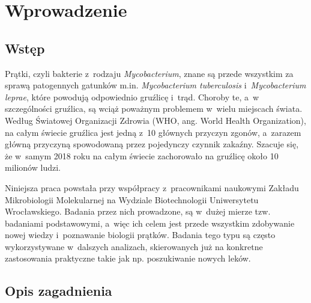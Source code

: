 \documentclass[declaration,shortabstract,mgr]{iithesis}
\author         {Artur Rosa}
\begin{document}



\chapter{Wprowadzenie}



\section{Wstęp}

Prątki, czyli bakterie z~rodzaju \emph{Mycobacterium}, znane są przede wszystkim za sprawą patogennych gatunków m.in. \emph{Mycobacterium tuberculosis} i~\emph{Mycobacterium leprae}, które powodują odpowiednio gruźlicę i~trąd. Choroby te, a~w szczególności gruźlica, są wciąż poważnym problemem w~wielu miejscach świata. Według Światowej Organizacji Zdrowia (WHO, ang. World Health Organization), na całym świecie gruźlica jest jedną z~10 głównych przyczyn zgonów, a~zarazem główną przyczyną spowodowaną przez pojedynczy czynnik zakaźny\cite{who-stats}. Szacuje się, że w~samym 2018 roku na całym świecie zachorowało na gruźlicę około 10 milionów ludzi.

Niniejsza praca powstała przy współpracy z~pracownikami naukowymi Zakładu Mikrobiologii Molekularnej na Wydziale Biotechnologii Uniwersytetu Wrocławskiego. Badania przez nich prowadzone, są w~dużej mierze tzw. badaniami podstawowymi, a~więc ich celem jest przede wszystkim zdobywanie nowej wiedzy i~poznawanie biologii prątków. Badania tego typu są często wykorzystywane w~dalszych analizach, skierowanych już na konkretne zastosowania praktyczne takie jak np. poszukiwanie nowych leków.


\section{Opis zagadnienia}
\label{sec:intro-description}
\end{document}
